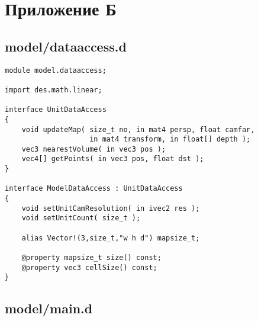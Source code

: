 \newpage
\section{Приложение Б}

\subsection{model/dataaccess.d}

\begin{verbatim}
module model.dataaccess;

import des.math.linear;

interface UnitDataAccess
{
    void updateMap( size_t no, in mat4 persp, float camfar,
                    in mat4 transform, in float[] depth );
    vec3 nearestVolume( in vec3 pos );
    vec4[] getPoints( in vec3 pos, float dst );
}

interface ModelDataAccess : UnitDataAccess
{
    void setUnitCamResolution( in ivec2 res );
    void setUnitCount( size_t );

    alias Vector!(3,size_t,"w h d") mapsize_t;

    @property mapsize_t size() const;
    @property vec3 cellSize() const;
}
\end{verbatim}

\subsection{model/main.d}

